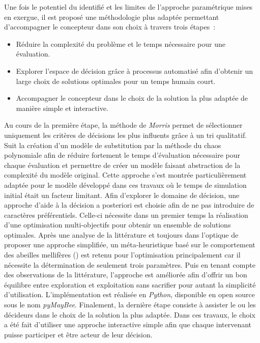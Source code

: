 Une fois le potentiel du  identifié et les limites de l’approche paramétrique
mises en exergue, il est proposé une méthodologie plus adaptée permettant d’accompagner
le concepteur dans son choix à travers trois étapes~:
\begin{itemize}
    \item Réduire la complexité du problème et le temps nécessaire pour une évaluation.
    \item Explorer l’espace de décision grâce à processus automatisé afin d’obtenir
          un large choix de solutions optimales pour un temps humain court.
    \item Accompagner le concepteur dans le choix de la solution la plus adaptée
          de manière simple et interactive.
\end{itemize}
Au cours de la première étape, la méthode de \textit{Morris} permet de sélectionner uniquement
les critères de décisions les plus influents grâce à un tri qualitatif. Suit la création
d’un modèle de substitution par la méthode du chaos polynomiale afin de réduire fortement le temps d’évaluation nécessaire
pour chaque évaluation et permettre de créer un modèle faisant abstraction de la complexité du modèle original.
Cette approche s’est montrée particulièrement adaptée pour le
modèle développé dans ces travaux où le temps de simulation initial était un facteur
limitant. Afin d’explorer le domaine de décision, une approche d’aide à la décision a
posteriori est choisie afin de ne pas introduire de caractères préférentiels. Celle-ci
nécessite dans un premier temps la réalisation d’une optimisation multi-objectifs pour
obtenir un ensemble de solutions optimales. Après une analyse de la littérature et
toujours dans l’optique de proposer une approche simplifiée, un méta-heuristique basé sur
le comportement des abeilles mellifères () est retenu pour l’optimisation principalement car
il nécessite la détermination de seulement trois paramètres. Puis en tenant compte des observations
de la littérature, l’approche est améliorée afin d’offrir un bon équilibre entre exploration
et exploitation sans sacrifier pour autant la simplicité d’utilisation. L’implémentation est
réalisée en \textit{Python}, disponible en open source sous le nom \textit{pyMayBee}.
Finalement, la dernière étape consiste à assister le ou
les décideurs dans le choix de la solution la plus adaptée. Dans ces travaux, le choix a
été fait d’utiliser une approche interactive simple afin que chaque intervenant puisse
participer et être acteur de leur décision.

